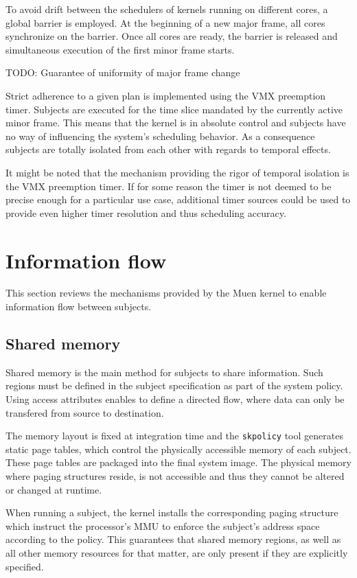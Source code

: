 To avoid drift between the schedulers of kernels running on different cores, a
global barrier is employed. At the beginning of a new major frame, all cores
synchronize on the barrier. Once all cores are ready, the barrier is released
and simultaneous execution of the first minor frame starts.

TODO: Guarantee of uniformity of major frame change

Strict adherence to a given plan is implemented using the VMX preemption timer.
Subjects are executed for the time slice mandated by the currently active minor
frame. This means that the kernel is in absolute control and subjects have no
way of influencing the system's scheduling behavior. As a consequence subjects
are totally isolated from each other with regards to temporal effects.

It might be noted that the mechanism providing the rigor of temporal isolation
is the VMX preemption timer. If for some reason the timer is not deemed to be
precise enough for a particular use case, additional timer sources could be used
to provide even higher timer resolution and thus scheduling accuracy.

\section{Information flow}
This section reviews the mechanisms provided by the Muen kernel to enable
information flow between subjects.

\subsection{Shared memory}
Shared memory is the main method for subjects to share information. Such regions
must be defined in the subject specification as part of the system policy. Using
access attributes enables to define a directed flow, where data can only be
transfered from source to destination.

The memory layout is fixed at integration time and the \texttt{skpolicy} tool
generates static page tables, which control the physically accessible memory of
each subject. These page tables are packaged into the final system image. The
physical memory where paging structures reside, is not accessible and thus they
cannot be altered or changed at runtime.

When running a subject, the kernel installs the corresponding paging structure
which instruct the processor's MMU to enforce the subject's address space
according to the policy. This guarantees that shared memory regions, as well as
all other memory resources for that matter, are only present if they are
explicitly specified.

